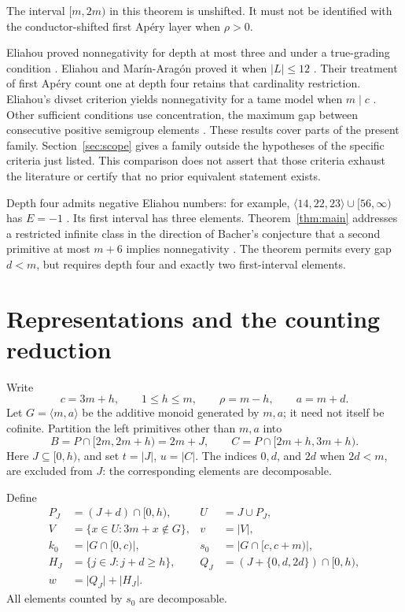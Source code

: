 \documentclass[11pt]{article}
\newcommand{\card}[1]{\lvert #1\rvert}
\begin{document}
The interval $[m,2m)$ in this theorem is unshifted. It must not be
identified with the conductor-shifted first Ap\'ery layer when $\rho>0$.

Eliahou proved nonnegativity for depth at most three and under a
true-grading condition \cite{eliahou}. Eliahou and Mar\'in-Arag\'on
proved it when $\card L\leq12$ \cite{twelve}. Their treatment of first
Ap\'ery count one at depth four retains that cardinality restriction.
Eliahou's divset criterion yields nonnegativity for a tame model when
$m\mid c$ \cite{divsets}. Other sufficient conditions use concentration,
the maximum gap between consecutive positive semigroup elements
\cite{concentration}. These results cover parts of the present family.
Section~\ref{sec:scope} gives a family outside the hypotheses of the
specific criteria just listed. This comparison does not assert that those
criteria exhaust the literature or certify that no prior equivalent
statement exists.

Depth four admits negative Eliahou numbers: for example,
$\langle14,22,23\rangle\cup[56,\infty)$ has $E=-1$
\cite{nearmisses}. Its first interval has three elements.
Theorem~\ref{thm:main} addresses a restricted infinite class in the
direction of Bacher's conjecture that a second primitive at most $m+6$
implies nonnegativity \cite{bacher}. The theorem permits every gap $d<m$,
but requires depth four and exactly two first-interval elements.

\section{Representations and the counting reduction}

Write
\[
 c=3m+h,\qquad 1\leq h\leq m,\qquad \rho=m-h,\qquad a=m+d.
\]
Let $G=\langle m,a\rangle$ be the additive monoid generated by $m,a$;
it need not itself be cofinite. Partition the left primitives other than
$m,a$ into
\[
 B=P\cap[2m,2m+h)=2m+J,\qquad
 C=P\cap[2m+h,3m+h).
\]
Here $J\subseteq[0,h)$, and set $t=\card J$, $u=\card C$.
The indices $0,d$, and $2d$ when $2d<m$, are excluded from $J$:
the corresponding elements are decomposable.

Define
\[
 \begin{aligned}
 P_J&=(J+d)\cap[0,h),& U&=J\cup P_J,\\
 V&=\{x\in U:3m+x\notin G\},& v&=\card V,\\
 k_0&=\card{G\cap[0,c)},&
 s_0&=\card{G\cap[c,c+m)},\\
 H_J&=\{j\in J:j+d\geq h\},&
 Q_J&=(J+\{0,d,2d\})\cap[0,h),\\
 w&=\card{Q_J}+\card{H_J}.&&
 \end{aligned}
\]
All elements counted by $s_0$ are decomposable.
\end{document}
